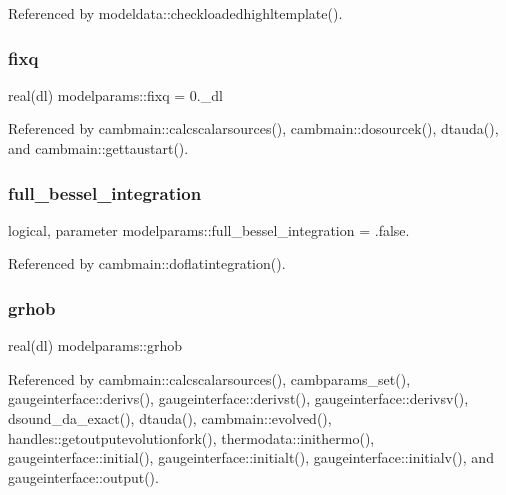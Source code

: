 Referenced by modeldata\+::checkloadedhighltemplate().

\mbox{\label{namespacemodelparams_a7288612ee3d61c71a35e8504a6c6be79}} 
\subsubsection{\texorpdfstring{fixq}{fixq}}
{\footnotesize\ttfamily real(dl) modelparams\+::fixq = 0.\+\_\+dl}



Referenced by cambmain\+::calcscalarsources(), cambmain\+::dosourcek(), dtauda(), and cambmain\+::gettaustart().

\mbox{\label{namespacemodelparams_a62664016ce9ca8fc8e53ebbfb8caa09c}} 
\subsubsection{\texorpdfstring{full\+\_\+bessel\+\_\+integration}{full\_bessel\_integration}}
{\footnotesize\ttfamily logical, parameter modelparams\+::full\+\_\+bessel\+\_\+integration = .false.}



Referenced by cambmain\+::doflatintegration().

\mbox{\label{namespacemodelparams_a0319101f7e0e2e39563baa34b7a77453}} 
\subsubsection{\texorpdfstring{grhob}{grhob}}
{\footnotesize\ttfamily real(dl) modelparams\+::grhob}



Referenced by cambmain\+::calcscalarsources(), cambparams\+\_\+set(), gaugeinterface\+::derivs(), gaugeinterface\+::derivst(), gaugeinterface\+::derivsv(), dsound\+\_\+da\+\_\+exact(), dtauda(), cambmain\+::evolved(), handles\+::getoutputevolutionfork(), thermodata\+::inithermo(), gaugeinterface\+::initial(), gaugeinterface\+::initialt(), gaugeinterface\+::initialv(), and gaugeinterface\+::output().

